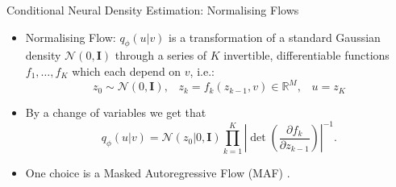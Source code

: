 \documentclass[12pt, aspectratio=169]{beamer}
\let\olditem\item
\renewcommand\item{\olditem\justifying}
\begin{document}
\begin{frame}{Conditional Neural Density Estimation: Normalising Flows}
    \begin{itemize}[<+->]
        \item Normalising Flow: $q_\phi(u|v)$ is a transformation of a standard Gaussian density $\mathcal{N}(0,\mathbf{I})$ through a series of $K$ invertible, differentiable functions $f_1, \ldots, f_K$ which each depend on $v$, i.e.:
        $$ z_0 \sim \mathcal{N}(0, \mathbf{I}), \;\;\; z_k = f_k(z_{k-1}, v) \in \mathbb{R}^M, \;\;\; u = z_K$$

        \item By a change of variables we get that
        $$q_\phi(u|v) = \mathcal{N}(z_0|0, \mathbf{I}) \prod_{k=1}^K \left|\det \left(\frac{\partial f_k}{\partial z_{k-1}}\right) \right|^{-1}.$$

            \item One choice is a Masked Autoregressive Flow (MAF) \parencite{papamakarios_masked_2018}.
            
        
    \end{itemize}
\end{frame}
\end{document}
